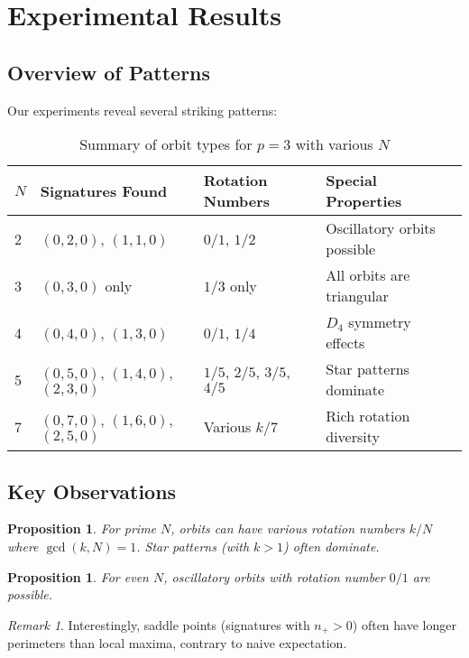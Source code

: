 \documentclass[11pt]{amsart}
\theoremstyle{plain}
\newtheorem{proposition}[theorem]{Proposition}
\theoremstyle{definition}
\theoremstyle{remark}
\newtheorem{remark}[theorem]{Remark}
\begin{document}
\section{Experimental Results}

\subsection{Overview of Patterns}

Our experiments reveal several striking patterns:

\begin{table}[h]
\centering
\begin{tabular}{@{}llll@{}}
\toprule
$N$ & Signatures Found & Rotation Numbers & Special Properties \\
\midrule
2 & $(0,2,0)$, $(1,1,0)$ & $0/1$, $1/2$ & Oscillatory orbits possible \\
3 & $(0,3,0)$ only & $1/3$ only & All orbits are triangular \\
4 & $(0,4,0)$, $(1,3,0)$ & $0/1$, $1/4$ & $D_4$ symmetry effects \\
5 & $(0,5,0)$, $(1,4,0)$, $(2,3,0)$ & $1/5$, $2/5$, $3/5$, $4/5$ & Star patterns dominate \\
7 & $(0,7,0)$, $(1,6,0)$, $(2,5,0)$ & Various $k/7$ & Rich rotation diversity \\
\bottomrule
\end{tabular}
\caption{Summary of orbit types for $p = 3$ with various $N$}
\end{table}

\subsection{Key Observations}

\begin{proposition}
For prime $N$, orbits can have various rotation numbers $k/N$ where $\gcd(k,N) = 1$. Star patterns (with $k > 1$) often dominate.
\end{proposition}

\begin{proposition}
For even $N$, oscillatory orbits with rotation number $0/1$ are possible.
\end{proposition}

\begin{remark}
Interestingly, saddle points (signatures with $n_+ > 0$) often have longer perimeters than local maxima, contrary to naive expectation.
\end{remark}
\end{document}

